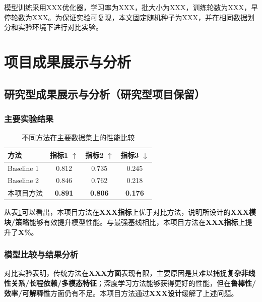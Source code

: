 \documentclass{style/course-report}
\begin{document}
模型训练采用XXX优化器，学习率为XXX，批大小为XXX，训练轮数为XXX，早停轮数为XXX。为保证实验可复现，本文固定随机种子为XXX，并在相同数据划分和实验环境下进行对比实验。

\section{项目成果展示与分析}

\subsection{研究型成果展示与分析（研究型项目保留）}

\subsubsection{主要实验结果}

\begin{table}[H]
    \centering
    \caption{不同方法在主要数据集上的性能比较}
    \begin{tabular}{lccc}
        \toprule
        方法 & 指标1 $\uparrow$ & 指标2 $\uparrow$ & 指标3 $\downarrow$ \\
        \midrule
        Baseline 1 & 0.812 & 0.735 & 0.245 \\
        Baseline 2 & 0.846 & 0.762 & 0.218 \\
        本项目方法 & \textbf{0.891} & \textbf{0.806} & \textbf{0.176} \\
        \bottomrule
    \end{tabular}
    \label{tab:main_results}
\end{table}

从表\ref{tab:main_results}可以看出，本项目方法在\textbf{XXX指标}上优于对比方法，说明所设计的\textbf{XXX模块/策略}能够有效提升模型性能。与最强基线相比，本项目方法在\textbf{XXX指标}上提升了\textbf{X\%}。

\subsubsection{模型比较与结果分析}

对比实验表明，传统方法在\textbf{XXX方面}表现有限，主要原因是其难以捕捉\textbf{复杂非线性关系/长程依赖/多模态特征}；深度学习方法能够获得更好的性能，但在\textbf{鲁棒性/效率/可解释性}方面仍有不足。本项目方法通过\textbf{XXX设计}缓解了上述问题。
\end{document}
